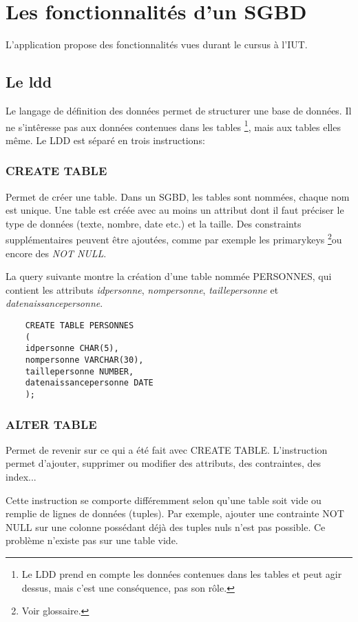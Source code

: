 \section{Les fonctionnalités d'un SGBD}
L'application propose des fonctionnalités vues durant le cursus à l'IUT.

\subsection{Le \gls{ldd}}
Le langage de définition des données permet de structurer une base de données.
Il ne s'intêresse pas aux données contenues dans les tables
\footnote{\label{interet_ldd}Le LDD prend en compte les données contenues dans les tables et peut agir dessus, mais c'est une conséquence, pas son rôle.}, mais aux tables elles même. Le LDD est séparé en trois instructions:

\subsubsection{CREATE TABLE}
Permet de créer une \gls{table}. Dans un SGBD, les tables sont nommées, chaque nom est unique.
Une table est créée avec au moins un attribut dont il faut préciser le type de données (texte, nombre, date etc.) et la taille.
Des \glspl{constraint} supplémentaires peuvent être ajoutées, comme par exemple les \glspl{primarykey} \footnote{\label{contrainte_clée_primaire}Voir glossaire.}ou encore des \textit{NOT NULL}.

La \gls{query} suivante montre la création d'une table nommée PERSONNES, qui contient les attributs \textit{idpersonne}, \textit{nompersonne}, \textit{taillepersonne} et \textit{datenaissancepersonne}.

  \begin{lstlisting}
    CREATE TABLE PERSONNES
    (
    idpersonne CHAR(5),
    nompersonne VARCHAR(30),
    taillepersonne NUMBER,
    datenaissancepersonne DATE
    );
  \end{lstlisting}


\subsubsection{ALTER TABLE}
Permet de revenir sur ce qui a été fait avec CREATE TABLE.
L'instruction permet d'ajouter, supprimer ou modifier des \glspl{attribut}, des contraintes, des index...

Cette instruction se comporte différemment selon qu'une table soit vide ou remplie de lignes de données (\glspl{tuple}).
Par exemple, ajouter une contrainte NOT NULL sur une colonne possédant déjà des tuples nuls n'est pas possible. Ce problème n'existe pas sur une table vide.

